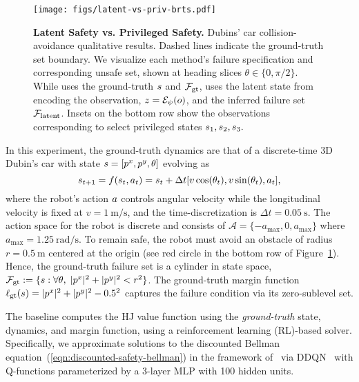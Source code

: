 \begin{figure}[t!]
    \centering
    \texttt{[image: figs/latent-vs-priv-brts.pdf]}
    \caption{\textbf{Latent Safety vs. Privileged Safety.} Dubins' car collision-avoidance qualitative results. Dashed lines indicate the ground-truth set boundary. We visualize each method's failure specification and corresponding unsafe set, shown at heading slices $\theta \in \{ 0, \pi/2 \}$. While \privsafe uses the ground-truth $s$ and $\mathcal{F}_\textrm{gt}$, \ours uses the latent state from encoding the observation, $z = \mathcal{E}_\psi(o)$, and the inferred failure set $\mathcal{F}_\textrm{latent}$. Insets on the bottom row show the observations corresponding to select privileged states $s_1, s_2, s_3.$ }
    \label{fig:dubins-results}
\end{figure}

In this experiment, the ground-truth dynamics are that of a discrete-time 3D Dubin's car with state $s = [p^x,p^y,\theta]$ evolving as
$$s_{t+1} = f(s_t, a_t) 
= s_t + \Delta t [v \cos(\theta_t), v \sin(\theta_t), a_t],$$ 
where the robot's action  $a$ controls angular velocity while the longitudinal velocity is fixed at $v = \SI{1}{\meter\per\second}$, and the time-discretization is $\Delta t = \SI{0.05}{\second}$.
The action space for the robot is discrete and consists of $\mathcal{A} = \{-a_\mathrm{max}, 0, a_\mathrm{max} \}$ where $a_\mathrm{max} = 1.25~\mathrm{rad/s}$.  
To remain safe, the robot must avoid an obstacle of radius $r = \SI{0.5}{\meter}$ centered at the origin (see red circle in the bottom row of Figure~\ref{fig:dubins-results}).
Hence, the ground-truth failure set is a cylinder in state space, $\mathcal{F}_\textrm{gt} := \{ s : \forall \theta, \; |p^x|^2 + |p^y|^2 < r^2\}$.
The ground-truth margin function $\ell_\textrm{gt}(s) = |p^x|^2 + |p^y|^2 - 0.5^2$ captures the failure condition via its zero-sublevel set.  

 The \privsafe baseline computes the HJ value function using the \emph{ground-truth} state, dynamics, and margin function, using a reinforcement learning (RL)-based solver.
Specifically, we approximate solutions to the discounted Bellman equation~(\ref{eqn:discounted-safety-bellman}) in the framework of~\cite{hsu2021safety} via DDQN~\cite{van2016deep} with Q-functions parameterized by a 3-layer MLP with 100 hidden units.

